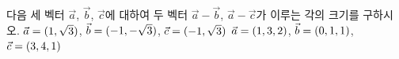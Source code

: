 다음 세 벡터 $\vec{a}$, $\vec{b}$, $\vec{c}$에 대하여 두 벡터 $\vec{a}-\vec{b}$, $\vec{a}-\vec{c}$가 이루는 각의 크기를 구하시오.
 $\vec{a}=(1{,}\mkern3mu\mathopen{}\sqrt{3})$, $\vec{b}=(-1{,}\mkern3mu\mathopen{}-\sqrt{3})$, $\vec{c}=(-1{,}\mkern3mu\mathopen{}\sqrt{3})$
 $\vec{a}=(1{,}\mkern3mu\mathopen{}3{,}\mkern3mu\mathopen{}2)$, $\vec{b}=(0{,}\mkern3mu\mathopen{}1{,}\mkern3mu\mathopen{}1)$, $\vec{c}=(3{,}\mkern3mu\mathopen{}4{,}\mkern3mu\mathopen{}1)$
